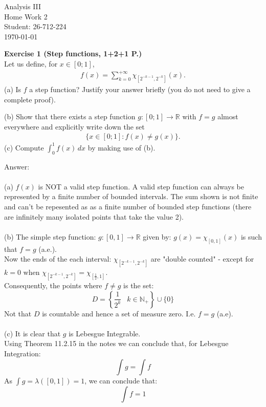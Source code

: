 \documentclass[12pt,a4paper]{article}
\begin{document}
\begin{titlepage}
\centering
\vspace*{\fill}
{\Huge Analysis III} \\[0.5cm]
{\Huge Home Work 2}\\[1.5cm]
{\Large Student: 26-712-224}\\[0.5cm]
{\Large \today}
\vspace*{\fill}
\end{titlepage}

\newpage

\noindent\textbf{Exercise 1 (Step functions, 1+2+1 P.)}\\
Let us define, for \(x\in[0;1]\),
\begin{align*}
f(x)=\sum_{k=0}^{+\infty}\chi_{[2^{-k-1},2^{-k}]}(x).
\end{align*}
(a) Is \(f\) a step function? Justify your answer briefly (you do not need to give a complete proof).

(b) Show that there exists a step function \(g:[0;1]\to\mathbb{R}\) with \(f=g\) almost everywhere and explicitly write down the set
\begin{align*}
\{x\in[0;1]:f(x)\ne g(x)\}.
\end{align*}
(c) Compute \(\int_0^1 f(x)\,dx\) by making use of (b).

\vspace{1cm}
\noindent
Answer:\\
\\
(a) $f(x)$ is NOT a valid step function.  A valid step function 
can always be represented by a finite number of bounded intervals. The sum shown is not finite and can't be repesented as as
a finite number of bounded step functions (there are infinitely many isolated points that take the value 2).\\
\\
(b) The simple step function: $g:[0, 1] \to \mathbb{R}$ given by: $g(x) = \chi_{[0,1]}(x)$ is such that $f=g$ (a.e.).\\
Now the ends of the each interval: $\chi_{[2^{-k-1},2^{-k}]}$ are "double counted" - except for\\
$k=0 \text{ when } \chi_{[2^{-k-1},2^{-k}]} = \chi_{[\frac{1}{2},1]}$.\\
Consequently, the points where $f \ne g$ is the set:
$$ D = \left\{ \frac{1}{2^k} \; \ \; k \in \mathbb{N}_{+} \right\} \cup \{0\} $$
Not that $D$ is countable and hence a set of measure zero.  I.e. $f=g$ (a.e).\\
 \\
(c) It is clear that $g$ is Lebesgue Integrable.\\
Using Theorem 11.2.15 in the notes we can conclude that, for Lebesgue Integration:\\
$$\int g = \int f$$
As $\int g = \lambda([0,1]) = 1$, we can conclude that:
$$\int f = 1$$
\end{document}
